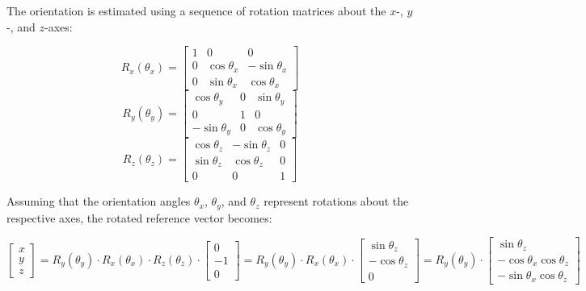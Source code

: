 \documentclass{article}
\begin{document}
    The orientation is estimated using a sequence of rotation matrices about the
    $x$-, $y$-, and $z$-axes:

    \[
        R_{x}(\theta_{x}) =
        \begin{bmatrix}
            1 & 0              & 0               \\
            0 & \cos\theta_{x} & -\sin\theta_{x} \\
            0 & \sin\theta_{x} & \cos\theta_{x}
        \end{bmatrix}
    \]
    \[
        R_{y}(\theta_{y}) =
        \begin{bmatrix}
            \cos\theta_{y}  & 0 & \sin\theta_{y} \\
            0               & 1 & 0              \\
            -\sin\theta_{y} & 0 & \cos\theta_{y}
        \end{bmatrix}
    \]
    \[
        R_{z}(\theta_{z}) =
        \begin{bmatrix}
            \cos\theta_{z} & -\sin\theta_{z} & 0 \\
            \sin\theta_{z} & \cos\theta_{z}  & 0 \\
            0              & 0               & 1
        \end{bmatrix}
    \]

    Assuming that the orientation angles $\theta_{x}$, $\theta_{y}$, and $\theta_{z}$
    represent rotations about the respective axes, the rotated reference vector
    becomes:

    \[
        \begin{bmatrix}
            x \\
            y \\
            z
        \end{bmatrix}
        = R_{y}(\theta_{y}) \cdot R_{x}(\theta_{x}) \cdot R_{z}(\theta_{z}) \cdot
        \begin{bmatrix}
            0  \\
            -1 \\
            0
        \end{bmatrix}
        = R_{y}(\theta_{y}) \cdot R_{x}(\theta_{x}) \cdot
        \begin{bmatrix}
            \sin\theta_{z}  \\
            -\cos\theta_{z} \\
            0
        \end{bmatrix}
        = R_{y}(\theta_{y}) \cdot
        \begin{bmatrix}
            \sin\theta_{z}                \\
            -\cos\theta_{x}\cos\theta_{z} \\
            -\sin\theta_{x}\cos\theta_{z}
        \end{bmatrix}
    \]
\end{document}
